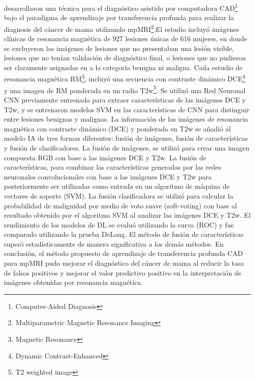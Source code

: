 \cite{Hu2020} desarrollaron una técnica para el diagnóstico asistido por computadora CAD\footnote{Computer-Aided Diagnosis} bajo el paradigma de aprendizaje por transferencia profunda para realizar la diagnosis del cáncer de mama utilizando mpMRI\footnote{Multiparametric Magnetic Resonance Imaging}.El estudio incluyó imágenes clínicas de resonancia magnética de 927 lesiones únicas de 616 mujeres, en donde se excluyeron las imágenes de lesiones que no presentaban una lesión visible, lesiones que no tenían validación de diagnóstico final, o lesiones que no pudieron ser claramente asignadas en a la categoría benigna ni maligna. Cada estudio de resonancia magnética RM\footnote{Magnetic Resonance}, incluyó una secuencia con contraste dinámico DCE\footnote{Dynamic Contrast-Enhanced} y una imagen de RM ponderada en un radio T2w\footnote{T2 weighted image}. Se utilizó una Red Neuronal CNN previamente entrenada para extraer características de las imágenes DCE y T2w, y se entrenaron modelos SVM en las características de CNN para distinguir entre lesiones benignas y malignas. La información de las imágenes de resonancia magnética con contraste dinámico (DCE) y ponderada en T2w se añadió al modelo IA de tres formas diferentes: fusión de imágenes, fusión de características y fusión de clasificadores. La fusión de imágenes, se utilizó para crear una imagen compuesta RGB con base a las imágenes DCE y T2w. La fusión de características, para combinar las características generadas por las redes neuronales convolucionales con base a las imágenes DCE y T2w para posteriormente ser utilizadas como entrada en un algoritmo de máquina de vectores de soporte (SVM). La fusión clasificadora se utilizó para calcular la probabilidad de malignidad por medio de voto suave (soft-voting) con base al resultado obtenido por el algoritmo SVM al analizar las imágenes DCE y T2w. El rendimiento de los modelos de DL se evaluó utilizando la curva (ROC) y fue comparado utilizando la prueba DeLong. El método de fusión de características superó estadísticamente de manera significativa a los demás métodos. En conclusión, el método propuesto de aprendizaje de transferencia profunda CAD para mpMRI pudo mejorar el diagnóstico del cáncer de mama al reducir la tasa de falsos positivos y mejorar el valor predictivo positivo en la interpretación de imágenes obtenidas por resonancia magnética.

